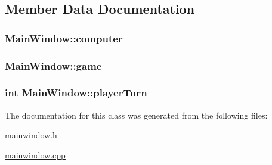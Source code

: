 \subsection{Member Data Documentation}
\hypertarget{class_main_window_a30196d7709d113dbd8262e67e7c629e2}{
\subsubsection[{computer}]{ Main\-Window\-::computer}}\label{class_main_window_a30196d7709d113dbd8262e67e7c629e2}
\hypertarget{class_main_window_a508d487e6a6e565884e8376d6583df10}{
\subsubsection[{game}]{ Main\-Window\-::game}}\label{class_main_window_a508d487e6a6e565884e8376d6583df10}
\hypertarget{class_main_window_ac8f0a233fbd35200774024901d525b25}{
\subsubsection[{player\-Turn}]{\setlength{\rightskip}{0pt plus 5cm}int Main\-Window\-::player\-Turn}}\label{class_main_window_ac8f0a233fbd35200774024901d525b25}


The documentation for this class was generated from the following files\-:\begin{DoxyCompactItemize}
\item 
\hyperlink{mainwindow_8h}{mainwindow.\-h}\item 
\hyperlink{mainwindow_8cpp}{mainwindow.\-cpp}\end{DoxyCompactItemize}
